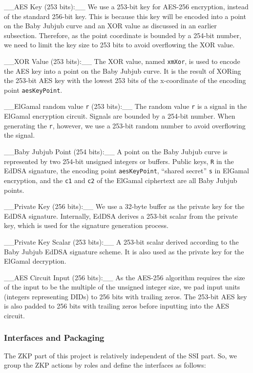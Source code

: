 \documentclass[
]{report}
\begin{document}
\_\_AES Key (253 bits):\_\_ We use a 253-bit key for AES-256
encryption, instead of the standard 256-bit key. This is because this
key will be encoded into a point on the Baby Jubjub curve and an XOR
value as discussed in an earlier subsection. Therefore, as the point
coordinate is bounded by a 254-bit number, we need to limit the key size
to 253 bits to avoid overflowing the XOR value.

\_\_XOR Value (253 bits):\_\_ The XOR value, named
\texttt{xmXor}, is used to encode the AES key into a point on the Baby
Jubjub curve. It is the result of XORing the 253-bit AES key with the
lowest 253 bits of the x-coordinate of the encoding point
\texttt{aesKeyPoint}.

\_\_ElGamal random value \texttt{r} (253 bits):\_\_ The random
value \texttt{r} is a signal in the ElGamal encryption circuit. Signals
are bounded by a 254-bit number. When generating the \texttt{r},
however, we use a 253-bit random number to avoid overflowing the signal.

\_\_Baby Jubjub Point (254 bits):\_\_ A point on the Baby Jubjub
curve is represented by two 254-bit unsigned integers or buffers. Public
keys, \texttt{R} in the EdDSA signature, the encoding point
\texttt{aesKeyPoint}, ``shared secret'' \texttt{s} in ElGamal
encryption, and the \texttt{c1} and \texttt{c2} of the ElGamal
ciphertext are all Baby Jubjub points.

\_\_Private Key (256 bits):\_\_ We use a 32-byte buffer as the
private key for the EdDSA signature. Internally, EdDSA derives a 253-bit
scalar from the private key, which is used for the signature generation
process.

\_\_Private Key Scalar (253 bits):\_\_ A 253-bit scalar derived
according to the Baby Jubjub EdDSA signature scheme. It is also used as
the private key for the ElGamal decryption.

\_\_AES Circuit Input (256 bits):\_\_ As the AES-256 algorithm
requires the size of the input to be the multiple of the unsigned
integer size, we pad input units (integers representing DIDs) to 256
bits with trailing zeros. The 253-bit AES key is also padded to 256 bits
with trailing zeros before inputting into the AES circuit.

\subsubsection{Interfaces and Packaging}

The ZKP part of this project is relatively independent of the SSI part.
So, we group the ZKP actions by roles and define the interfaces as
follows:
\end{document}
